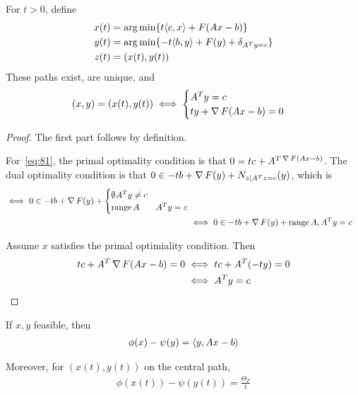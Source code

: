 
\begin{proposition}
  For $t > 0$, define
  \begin{align}
    \label{eq:80}
    x(t) &= \argmin \{ t \IP{c, x} + F(Ax - b) \} \\
    y(t) &= \argmin \{ -t \IP{b, y} + F(y) + \delta_{A^{T} y = c} \} \\
    z(t) &= (x(t), y(t))
  \end{align}
  These paths exist, are unique, and
  \begin{align}
    \label{eq:81}
    (x, y) = (x(t), y(t)) \iff
    \begin{cases}
      A^{T} y = c \\
      ty + \operatorname*{\nabla} F(Ax - b) = 0
    \end{cases}
  \end{align}
\end{proposition}

\begin{proof}
  The first part follows by definition.

  For~\eqref{eq:81}, the primal optimality condition is that $0 = tc +
  A^{T \operatorname*{\nabla} F(Ax - b)}$. The dual optimality condition is that $0 \in
  -tb + \operatorname*{\nabla} F(y) + N_{z | A^{T}z = c}(y)$, which is
  \begin{align}
    \label{eq:82}
    \iff 0 \in -tb + \operatorname*{\nabla} F(y) +
    \begin{cases}
      \emptyset ^{} A^{T} y \neq c \\
      \operatorname*{range} A & A^{T} y = c
    \end{cases} \\
    &\iff 0 \in -tb + \operatorname*{\nabla} F(y) + \operatorname*{range} A, A^{T} y = c
  \end{align}

  Assume $x$ satisfies the primal optimiality condition. Then
  \begin{align}
    \label{eq:83}
    tc + A^{T} \operatorname*{\nabla} F(Ax - b) = 0 &\iff tc + A^{T}(-ty) = 0 \\
    &\iff A^{T}y = c
  \end{align}
\end{proof}

\begin{proposition}
  If $x, y$ feasible, then
  \begin{align}
    \label{eq:84}
    \phi(x) - \psi(y) = \IP{y, Ax - b}
  \end{align}

  Moreover, for $(x(t), y(t))$ on the central path,
  \begin{align}
    \label{eq:85}
    \phi(x(t)) - \psi(y(t)) = \frac{\Theta_{F}}{t}
  \end{align}
\end{proposition}

